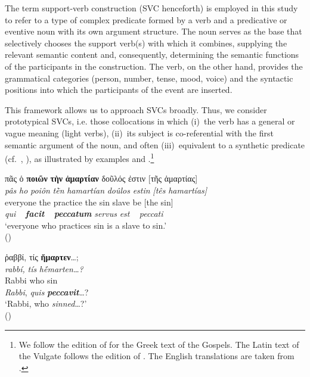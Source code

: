 \documentclass[output=paper,colorlinks,citecolor=brown]{langscibook}
\begin{document}
The term support-verb construction (SVC henceforth) is employed in this study to refer to a type of
complex predicate formed by a verb and a predicative or eventive noun with its own
argument structure. The noun serves as the base that selectively chooses the support
verb(s) with which it combines, supplying the relevant semantic content and, consequently,
determining the semantic functions of the participants in the construction. The verb, on
the other hand, provides the grammatical categories (person, number, tense, mood, voice)
and the syntactic positions into which the participants of the event are inserted.

This framework allows us to approach SVCs broadly. Thus, we consider prototypical SVCs,
i.e. those collocations in which (i)~the verb has a general or vague meaning (light
verbs), (ii)~its subject is co-referential with the first semantic argument of the noun,
and often (iii)~equivalent to a synthetic predicate (cf.~\cite{Langer2004},
\cite{JiménezLópez2016}), as illustrated by examples  and
.\footnote{We follow the edition of
  \citet{Nestle-AlandNestleAland2012} for the Greek text of the Gospels. The Latin text of
  the Vulgate follows the edition of \citet{WeberGryson2007}. 
  The English translations are taken from
  \citet{EnglishStandardVersion2007}.}


\ea\label{ex:bj:1}

\ea\label{ex:bj:1a}

\gllll πᾶς ὁ \textbf{ποιῶν} \textbf{τὴν} \textbf{ἁμαρτίαν} δοῦλός ἐστιν {[}τῆς ἁμαρτίας{]}\\
 \textit{pâs} \textit{ho} \textit{poiôn} \textit{tḕn} \textit{hamartían} \textit{doûlos} \textit{estin} \textit{\emph{[}tês} \textit{hamartías\emph{]}}\\
everyone the practice the sin slave be {[}the sin{]}\\
\emph{qui} ~ \textbf{\itshape facit} ~ \textbf{\itshape peccatum} \emph{servus} \emph{est} ~ \emph{peccati}\\
\glt `everyone who practices sin is a slave to sin.' \\
\hspace*{\fill}() \\

\ex\label{ex:bj:1b}

\gllll ῥαββί, τίς \textbf{ἥμαρτεν}\ldots;\\
 \textit{rabbí,} \textit{tís} \textit{hḗmarten\ldots?}\\
Rabbi who sin\\
\emph{Rabbi}, \emph{quis} \textbf{\itshape peccavit}\ldots?\\
\glt `Rabbi, who \emph{sinned}\ldots?' \\
\hspace*{\fill}() \\
\end{document}
